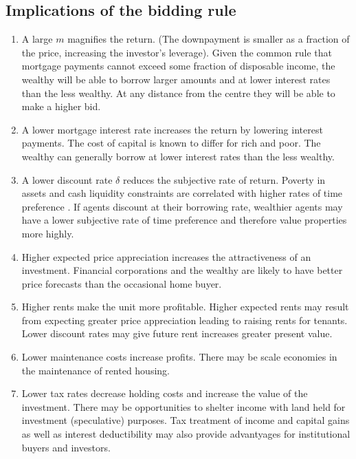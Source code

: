 \subsection{Implications of the bidding rule}
\begin{enumerate}
\item A large $m$ magnifies the return. (The downpayment is smaller as a fraction of the price, increasing the investor's leverage). 
Given the  common rule that mortgage payments cannot exceed some fraction of disposable income, the wealthy will be able to borrow larger amounts and at lower interest rates than the less wealthy. At any distance from the centre they will be able to make a higher bid.

\item A lower mortgage interest rate increases the return by lowering interest payments. The cost of capital is known to differ for rich and poor.  The wealthy can generally borrow  at lower interest rates than the less wealthy. 

\item A lower discount rate $\delta$ reduces the subjective rate of return.  Poverty in assets and cash liquidity constraints are correlated with higher rates of time preference  \cite{carvalhoPovertyTimePreference2010}\cite{holdenPovertyMarketImperfections1998}. If agents discount at their borrowing rate, wealthier agents may have a lower subjective rate of time preference and therefore value properties more highly. 

\item Higher expected price appreciation increases the attractiveness of an investment. Financial corporations and the wealthy are likely to have better price forecasts than  the occasional home buyer.

\item Higher rents make the unit more profitable. Higher expected  rents may result from expecting greater price appreciation  leading to raising rents for tenants. Lower discount rates may give future rent increases greater present value.

\item Lower maintenance costs increase profits. There may be scale economies in the maintenance  of rented housing. 

\item Lower tax rates decrease holding costs and increase the value of the investment. There may be opportunities to shelter income with land held for investment (speculative) purposes. Tax treatment of income and capital gains as well as interest deductibility may also provide advantyages for institutional buyers and investors.%
\end{enumerate}

